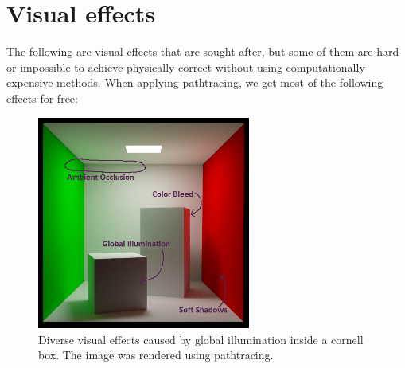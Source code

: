 \documentclass{ACGSeminar}
\begin{document}
\section{Visual effects} \label{visual_effects}
	The following are visual effects that are sought after, but some of them are hard or impossible to achieve physically correct without using
	computationally expensive methods. When applying pathtracing, we get most of the following effects for free: 
	\begin{figure}[htb!]%
	\begin{center}%
		\includegraphics[width=7cm]{img/visual_effects.png}
	\end{center}%
	\caption{Diverse visual effects caused by global illumination inside a cornell box. The image was rendered using pathtracing.}%
	\label{fig:visual_effects}%
	\end{figure}%
\end{document}
